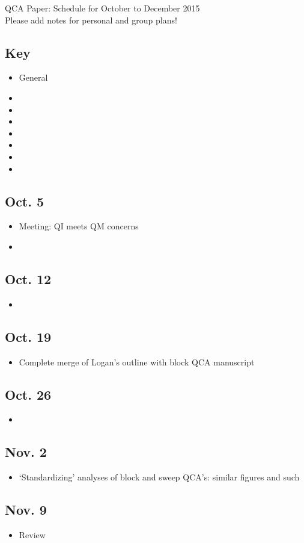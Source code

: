 \documentclass[11pt]{article}
\newenvironment{week}[1]{
\subsection*{#1}
\begin{itemize}
\setlength\itemsep{0mm}
}{
\end{itemize}}
\begin{document}
\begin{center}
{\LARGE QCA Paper: Schedule for October to December 2015 }\\
{\large Please add notes for personal and group plans! }
\end{center}

\vspace{0.5cm}

\begin{multicols}{2}

\begin{week}{Key}
\item General
\item {}
\item {}
\item {}
\item {}
\item {}
\item {}
\item {}
\end{week}

\begin{week}{Oct. 5}
\item Meeting: QI meets QM concerns
\item {}
\end{week}

\begin{week}{Oct. 12}
\item {}
\end{week}

\begin{week}{Oct. 19}
\item Complete merge of Logan's outline with block QCA manuscript
\end{week}

\begin{week}{Oct. 26}
\item {}
\end{week}

\begin{week}{Nov. 2}
\item `Standardizing' analyses of block and sweep QCA's: similar figures and such
\end{week}

\begin{week}{Nov. 9}
\item Review
\end{week}


\end{multicols}
\end{document}
